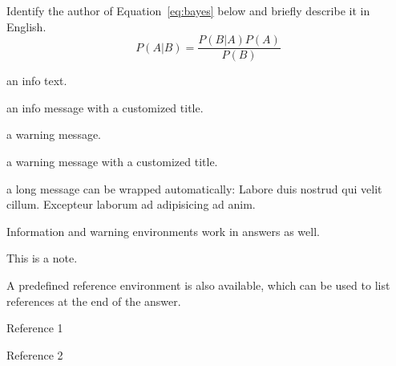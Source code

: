 \documentclass[11pt]{article}
\begin{document}
\begin{question}{}
  Identify the author of Equation~\ref{eq:bayes} below and briefly describe it in English.
  \begin{equation}\label{eq:bayes}
    P(A|B) = \frac{P(B|A)P(A)}{P(B)}
  \end{equation}

  \begin{info}
    an info text.
  \end{info}
  \begin{info}[Information:]
    an info message with a customized title.
  \end{info}

  \begin{warn}
    a warning message.
  \end{warn}
  \begin{warn}[Warning:]
    a warning message with a customized title.
  \end{warn}

  \begin{warn}
    a long message can be wrapped automatically:
    Labore duis nostrud qui velit cillum. Excepteur laborum ad adipisicing ad anim.
  \end{warn}

  \begin{answer}
    Information and warning environments work in answers as well.
    \begin{info}[Note:]
      This is a note.
    \end{info}

    A predefined reference environment is also available, which can be used to list references at the end of the answer.
    \begin{reference}
    \item Reference 1
    \item Reference 2
    \end{reference}
  \end{answer}
\end{question}
\end{document}
